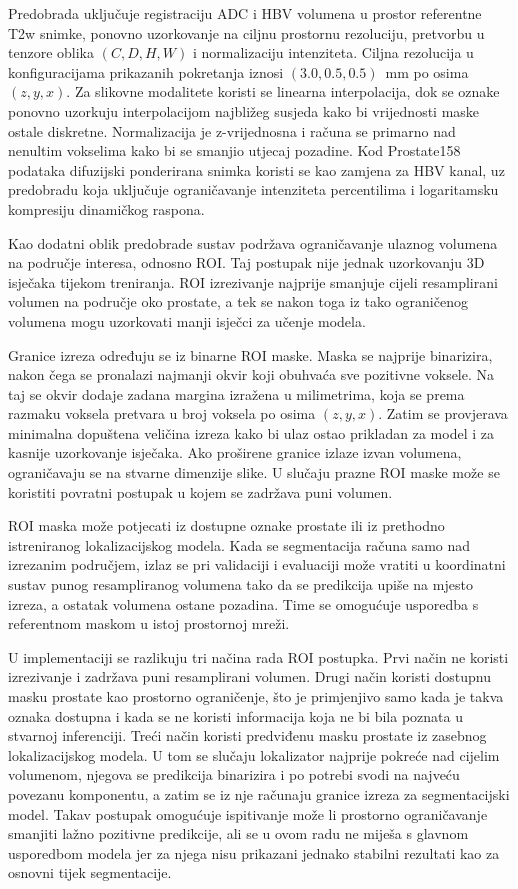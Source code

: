\documentclass[a4paper,12pt,oneside]{article}
\begin{document}
Predobrada uključuje registraciju ADC i HBV volumena u prostor referentne T2w snimke, ponovno uzorkovanje na ciljnu prostornu rezoluciju, pretvorbu u tenzore oblika $(C, D, H, W)$ i normalizaciju intenziteta. Ciljna rezolucija u konfiguracijama prikazanih pokretanja iznosi $(3.0, 0.5, 0.5)$~mm po osima $(z, y, x)$. Za slikovne modalitete koristi se linearna interpolacija, dok se oznake ponovno uzorkuju interpolacijom najbližeg susjeda kako bi vrijednosti maske ostale diskretne. Normalizacija je z-vrijednosna i računa se primarno nad nenultim vokselima kako bi se smanjio utjecaj pozadine. Kod Prostate158 podataka difuzijski ponderirana snimka koristi se kao zamjena za HBV kanal, uz predobradu koja uključuje ograničavanje intenziteta percentilima i logaritamsku kompresiju dinamičkog raspona.

Kao dodatni oblik predobrade sustav podržava ograničavanje ulaznog volumena na područje interesa, odnosno ROI. Taj postupak nije jednak uzorkovanju 3D isječaka tijekom treniranja. ROI izrezivanje najprije smanjuje cijeli resamplirani volumen na područje oko prostate, a tek se nakon toga iz tako ograničenog volumena mogu uzorkovati manji isječci za učenje modela.

Granice izreza određuju se iz binarne ROI maske. Maska se najprije binarizira, nakon čega se pronalazi najmanji okvir koji obuhvaća sve pozitivne voksele. Na taj se okvir dodaje zadana margina izražena u milimetrima, koja se prema razmaku voksela pretvara u broj voksela po osima $(z, y, x)$. Zatim se provjerava minimalna dopuštena veličina izreza kako bi ulaz ostao prikladan za model i za kasnije uzorkovanje isječaka. Ako proširene granice izlaze izvan volumena, ograničavaju se na stvarne dimenzije slike. U slučaju prazne ROI maske može se koristiti povratni postupak u kojem se zadržava puni volumen.

ROI maska može potjecati iz dostupne oznake prostate ili iz prethodno istreniranog lokalizacijskog modela. Kada se segmentacija računa samo nad izrezanim područjem, izlaz se pri validaciji i evaluaciji može vratiti u koordinatni sustav punog resampliranog volumena tako da se predikcija upiše na mjesto izreza, a ostatak volumena ostane pozadina. Time se omogućuje usporedba s referentnom maskom u istoj prostornoj mreži.

U implementaciji se razlikuju tri načina rada ROI postupka. Prvi način ne koristi izrezivanje i zadržava puni resamplirani volumen. Drugi način koristi dostupnu masku prostate kao prostorno ograničenje, što je primjenjivo samo kada je takva oznaka dostupna i kada se ne koristi informacija koja ne bi bila poznata u stvarnoj inferenciji. Treći način koristi predviđenu masku prostate iz zasebnog lokalizacijskog modela. U tom se slučaju lokalizator najprije pokreće nad cijelim volumenom, njegova se predikcija binarizira i po potrebi svodi na najveću povezanu komponentu, a zatim se iz nje računaju granice izreza za segmentacijski model. Takav postupak omogućuje ispitivanje može li prostorno ograničavanje smanjiti lažno pozitivne predikcije, ali se u ovom radu ne miješa s glavnom usporedbom modela jer za njega nisu prikazani jednako stabilni rezultati kao za osnovni tijek segmentacije.
\end{document}
